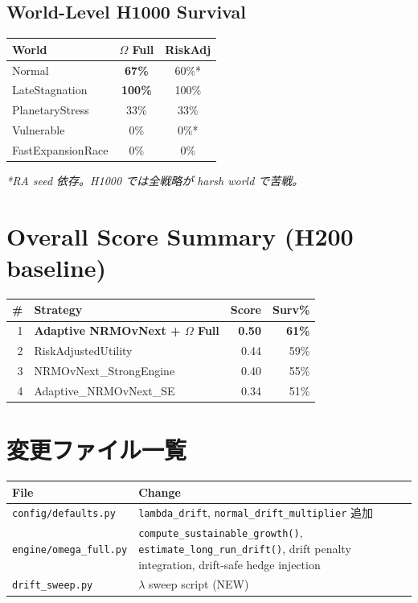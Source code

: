 \documentclass[11pt,a4paper]{article}
\begin{document}
\subsection{World-Level H1000 Survival}

\begin{tabular}{@{}lcc@{}}\toprule
\textbf{World} & \textbf{$\Omega$ Full} & \textbf{RiskAdj} \\\midrule
Normal & \textbf{67\%} & 60\%* \\
LateStagnation & \textbf{100\%} & 100\% \\
PlanetaryStress & 33\% & 33\% \\
Vulnerable & 0\% & 0\%* \\
FastExpansionRace & 0\% & 0\% \\
\bottomrule\end{tabular}

\textit{*RA seed 依存。H1000 では全戦略が harsh world で苦戦。}

\section{Overall Score Summary (H200 baseline)}

\begin{tabular}{@{}rlrr@{}}\toprule
\# & Strategy & Score & Surv\% \\\midrule
\rowcolor{np!8}1 & \textbf{Adaptive NRMOvNext + $\Omega$ Full} & \textbf{0.50} & \textbf{61\%} \\
2 & RiskAdjustedUtility & 0.44 & 59\% \\
3 & NRMOvNext\_StrongEngine & 0.40 & 55\% \\
4 & Adaptive\_NRMOvNext\_SE & 0.34 & 51\% \\
\bottomrule\end{tabular}


\section{変更ファイル一覧}

\begin{tabular}{@{}lp{8.5cm}@{}}\toprule
\textbf{File} & \textbf{Change} \\\midrule
\texttt{config/defaults.py} & \texttt{lambda\_drift}, \texttt{normal\_drift\_multiplier} 追加 \\
\texttt{engine/omega\_full.py} & \texttt{compute\_sustainable\_growth()}, \texttt{estimate\_long\_run\_drift()}, drift penalty integration, drift-safe hedge injection \\
\texttt{drift\_sweep.py} & $\lambda$ sweep script (NEW) \\
\bottomrule\end{tabular}
\end{document}
